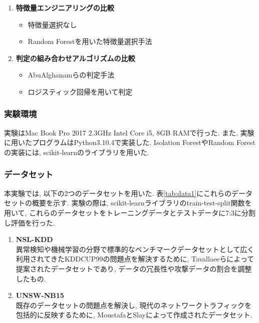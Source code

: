\documentclass{css}
\begin{document}
\begin{enumerate}
    \item \textbf{特徴量エンジニアリングの比較}
        \begin{itemize}
            \item 特徴量選択なし
            \item Random Forestを用いた特徴量選択手法
        \end{itemize}
    \item \textbf{判定の組み合わせアルゴリズムの比較}
        \begin{itemize}
            \item AbuAlghanamらの判定手法\cite{AbuAlghanam2023-sx}
            \item ロジスティック回帰を用いて判定
        \end{itemize}
\end{enumerate}

\subsubsection{実験環境}

実験はMac Book Pro 2017 2.3GHz Intel Core i5, 8GB RAMで行った. また, 実験に用いたプログラムはPython3.10.4で実装した. Isolation ForestやRandom Forestの実装には, scikit-learnのライブラリを用いた\cite{scikit-learn}. 

\subsubsection{データセット}
本実験では, 以下の2つのデータセットを用いた. 表\ref{tab:data1}にこれらのデータセットの概要を示す. 実験の際は, scikit-learnライブラリのtrain-test-split関数を用いて, これらのデータセットをトレーニングデータとテストデータに7:3に分割し評価を行った. 

\begin{enumerate}
    \item \textbf{NSL-KDD}\\
        異常検知や機械学習の分野で標準的なベンチマークデータセットとして広く利用されてきたKDDCUP99\cite{KDDCUP99}の問題点を解決するために, Tavallaeeらによって提案されたデータセットであり, データの冗長性や攻撃データの割合を調整したもの\cite{Tavallaee2009-we}. 
    \item \textbf{UNSW-NB15}\\
        既存のデータセットの問題点を解決し, 現代のネットワークトラフィックを包括的に反映するために, MoustafaとSlayによって作成されたデータセット\cite{Moustafa2015-cg}. 
\end{enumerate}
\end{document}
